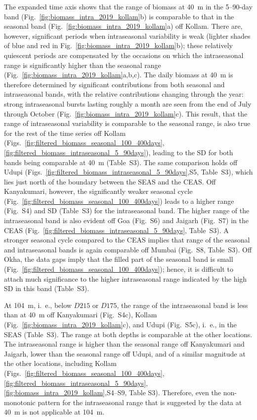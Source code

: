 \documentclass[authoryear,review,11pt]{elsarticle}
\providecommand{\DIFaddtex}[1]{{\protect\color{blue}\uwave{#1}}} %
\providecommand{\DIFaddbegin}{} %
\providecommand{\DIFaddend}{} %
\providecommand{\DIFadd}[1]{\texorpdfstring{\DIFaddtex{#1}}{#1}} %
\begin{document}
The expanded time axis shows that the range of biomass at 40~m in the 5--90-day band (Fig.~\ref{fig:biomass_intra_2019_kollam}b) is comparable to that in the seasonal band (Fig.~\ref{fig:biomass_intra_2019_kollam}a) off Kollam.  There are, however, significant periods when intraseasonal variability is weak (lighter shades of blue and red in Fig.~\ref{fig:biomass_intra_2019_kollam}b); these relatively quiescent periods are compensated by the occasions on which the intraseasonal range is significantly higher than the seasonal range (Fig.~\ref{fig:biomass_intra_2019_kollam}a,b,c). The daily biomass at 40~m is therefore determined by significant contributions from both seasonal and intraseasonal bands, with the relative contributions changing through the year: strong intraseasonal bursts lasting roughly a month are seen from the end of July through October (Fig.~\ref{fig:biomass_intra_2019_kollam}c). This result, that the range of intraseasonal variability is comparable to the seasonal range, is also true for the rest of the time series off Kollam (Figs.~\ref{fig:filtered_biomass_seasonal_100_400days},\ref{fig:filtered_biomass_intraseasonal_5_90days}), leading to the SD for both bands being comparable at 40~m (Table~S3).  The same comparison holds off Udupi (Figs.~\ref{fig:filtered_biomass_intraseasonal_5_90days},S5, Table~S3), which lies just north of the boundary between the SEAS and the CEAS.  Off Kanyakumari, however, the significantly weaker seasonal cycle (Fig.~\ref{fig:filtered_biomass_seasonal_100_400days}) leads to a higher range (Fig.~S4) and SD (Table~S3) for the intraseasonal band.  The higher range of the intraseasonal band is also evident off Goa (Fig.~S6) and Jaigarh (Fig.~S7) in the CEAS (Fig.~\ref{fig:filtered_biomass_intraseasonal_5_90days}, Table~S3). A stronger seasonal cycle \DIFaddbegin \DIFadd{at NEAS }\DIFaddend compared to the CEAS implies that range of the seasonal and intraseasonal bands is again comparable off Mumbai (Fig.~S8, Table~S3).  Off Okha, the data gaps imply that the filled part of the seasonal band is small (Fig.~\ref{fig:filtered_biomass_seasonal_100_400days}); hence, it is difficult to attach much significance to the higher intraseasonal range indicated by the high SD in this band (Table~S3).

At 104~m, i.~e., below $D215$ or $D175$, the range of the intraseasonal band is less than at 40~m off Kanyakumari (Fig.~S4c), Kollam (Fig.~\ref{fig:biomass_intra_2019_kollam}c), and Udupi (Fig.~S5c), i.~e., in the SEAS (Table~S3).  The range at both depths is comparable at the other locations. The intraseasonal range is higher than the seasonal range off Kanyakumari and Jaigarh, lower than the seasonal range off Udupi, and of a similar magnitude at the other locations, including Kollam (Figs.~\ref{fig:filtered_biomass_seasonal_100_400days},\ref{fig:filtered_biomass_intraseasonal_5_90days},\ref{fig:biomass_intra_2019_kollam},S4--S9, Table S3). Therefore, even the non-monotonic pattern for the intraseasonal range that is suggested by the data at 40~m is not applicable at 104~m.
\end{document}
